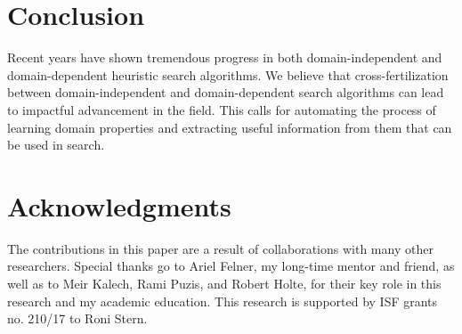 \documentclass{article}
\begin{document}
\section{Conclusion}

Recent years have shown tremendous progress in both domain-independent and domain-dependent heuristic search algorithms. We believe that cross-fertilization between domain-independent and domain-dependent search algorithms can lead to impactful advancement in the field. This calls for automating the process of learning domain properties and extracting useful information from them that can be used in search. 



\section*{Acknowledgments}
The contributions in this paper are a result of collaborations with many other researchers. Special thanks go to Ariel Felner, my long-time mentor and friend, as well as to Meir Kalech, Rami Puzis, and Robert Holte, for their key role in 
this research and my academic education. 
This research is supported by ISF grants no. 210/17 to Roni Stern. 

\small

 
\end{document}
